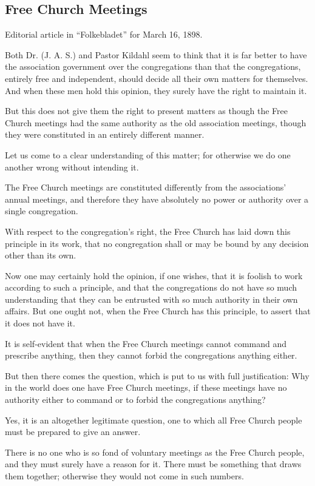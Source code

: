 
\subsection{Free Church Meetings}

Editorial article in “Folkebladet” for March 16, 1898.

Both Dr. (J. A. S.) and Pastor Kildahl seem to think that it is far better to have the association government over the congregations than that the congregations, entirely free and independent, should decide all their own matters for themselves. And when these men hold this opinion, they surely have the right to maintain it.

But this does not give them the right to present matters as though the Free Church meetings had the same authority as the old association meetings, though they were constituted in an entirely different manner.

Let us come to a clear understanding of this matter; for otherwise we do one another wrong without intending it.

The Free Church meetings are constituted differently from the associations’ annual meetings, and therefore they have absolutely no power or authority over a single congregation.

With respect to the congregation’s right, the Free Church has laid down this principle in its work, that no congregation shall or may be bound by any decision other than its own.

Now one may certainly hold the opinion, if one wishes, that it is foolish to work according to such a principle, and that the congregations do not have so much understanding that they can be entrusted with so much authority in their own affairs. But one ought not, when the Free Church has this principle, to assert that it does not have it.

It is self-evident that when the Free Church meetings cannot command and prescribe anything, then they cannot forbid the congregations anything either.

But then there comes the question, which is put to us with full justification: Why in the world does one have Free Church meetings, if these meetings have no authority either to command or to forbid the congregations anything?

Yes, it is an altogether legitimate question, one to which all Free Church people must be prepared to give an answer.

There is no one who is so fond of voluntary meetings as the Free Church people, and they must surely have a reason for it. There must be something that draws them together; otherwise they would not come in such numbers.

